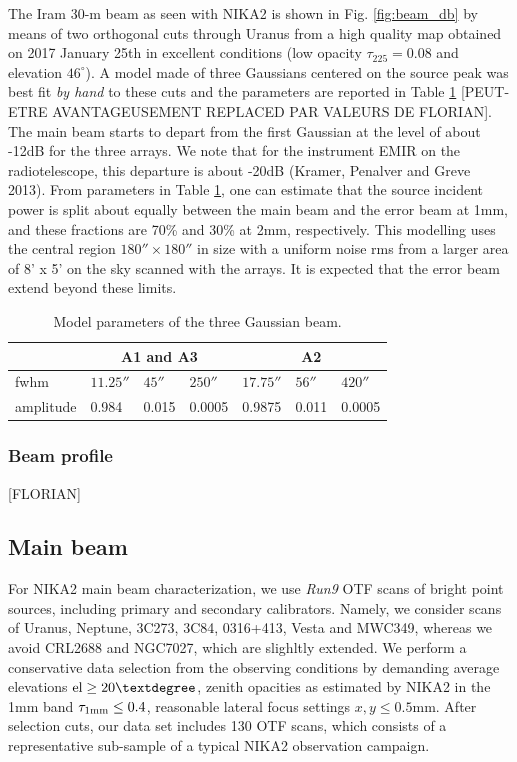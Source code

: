 The Iram 30-m beam as seen with NIKA2 is shown in
Fig. \ref{fig:beam_db} by means of two orthogonal cuts through Uranus
from a high quality map obtained on 2017 January 25th in excellent conditions
(low opacity $\tau_{225}=0.08$ and elevation $46^{\circ}$).
A model made of three Gaussians centered on the source peak was best
fit {\it by hand} to these cuts and the parameters are reported in
Table \ref{tab:3gauss} [PEUT-ETRE AVANTAGEUSEMENT REPLACED PAR VALEURS DE FLORIAN].
The main beam starts to depart from the first
Gaussian at the level of about -12dB for the three arrays.
We note that for the instrument EMIR on the radiotelescope,
this departure is about -20dB (Kramer, Penalver and Greve 2013).
From parameters in Table \ref{tab:3gauss}, one can estimate that
the source incident power is split about equally between the main beam
and the error beam at 1mm, and these fractions are 70\% and 30\% at 2mm, respectively.
This modelling uses the central
region   $180'' \times 180''$ in size with a uniform noise rms from
a larger area of 8' x 5' on the sky scanned with the arrays. It is expected
that the error beam extend beyond these limits.


\begin{table}
\centering 
\caption[]{Model parameters of the three Gaussian beam.}
\begin{tabular}{|l|l|l|l|l|l|l|}
\hline
               & \multicolumn{3}{c|}{A1 and A3} & \multicolumn{3}{c|}{A2}  \\
\hline
fwhm      & $11.25''$ & $45''$  & $250''$ & $17.75''$ & $56''$  & $420''$ \\
amplitude & 0.984     & 0.015   & 0.0005   &  0.9875   & 0.011   &  0.0005\\
\hline
\end{tabular}
\label{tab:3gauss}
\end{table}


\subsubsection{Beam profile}

[FLORIAN]


\subsection{Main beam}

For NIKA2 main beam characterization, we use \emph{Run9} OTF scans of bright point sources, including primary and secondary calibrators. Namely, we consider scans of Uranus, Neptune, 3C273, 3C84, 0316+413, Vesta and MWC349, whereas we avoid CRL2688 and NGC7027, which are slighltly extended. We perform a conservative data selection from the observing conditions by demanding average elevations $\rm{el} \ge 20°$, zenith opacities as estimated by NIKA2 in the 1mm band $\tau_{1\rm{mm}} \le 0.4$, reasonable lateral focus settings $x, y \le 0.5$mm. After selection cuts, our data set includes 130 OTF scans, which consists of a representative sub-sample of a typical NIKA2 observation campaign.    

